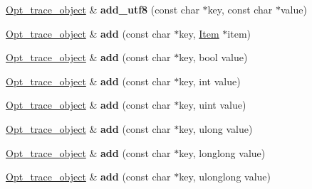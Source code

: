 \begin{DoxyCompactItemize}
\mbox{\hyperlink{classOpt__trace__object}{Opt\+\_\+trace\+\_\+object}} \& {\bfseries add\+\_\+utf8} (const char $\ast$key, const char $\ast$value)
\item 
\mbox{\label{classOpt__trace__object_a8cc4012204abaa38edaae22cf740b76b}} 
\mbox{\hyperlink{classOpt__trace__object}{Opt\+\_\+trace\+\_\+object}} \& {\bfseries add} (const char $\ast$key, \mbox{\hyperlink{classItem}{Item}} $\ast$item)
\item 
\mbox{\label{classOpt__trace__object_ad914de70676c6bf4f9e2e01c61696074}} 
\mbox{\hyperlink{classOpt__trace__object}{Opt\+\_\+trace\+\_\+object}} \& {\bfseries add} (const char $\ast$key, bool value)
\item 
\mbox{\label{classOpt__trace__object_a7935469510d95e01d19e856a3825cca1}} 
\mbox{\hyperlink{classOpt__trace__object}{Opt\+\_\+trace\+\_\+object}} \& {\bfseries add} (const char $\ast$key, int value)
\item 
\mbox{\label{classOpt__trace__object_a061fe9479a9125a7c4e09d5cb9494d0f}} 
\mbox{\hyperlink{classOpt__trace__object}{Opt\+\_\+trace\+\_\+object}} \& {\bfseries add} (const char $\ast$key, uint value)
\item 
\mbox{\label{classOpt__trace__object_aaa3527ead737f82881e1a12662cdef10}} 
\mbox{\hyperlink{classOpt__trace__object}{Opt\+\_\+trace\+\_\+object}} \& {\bfseries add} (const char $\ast$key, ulong value)
\item 
\mbox{\label{classOpt__trace__object_a01eb09a597f2a8c582508b4e48524c7f}} 
\mbox{\hyperlink{classOpt__trace__object}{Opt\+\_\+trace\+\_\+object}} \& {\bfseries add} (const char $\ast$key, longlong value)
\item 
\mbox{\label{classOpt__trace__object_a89a201ef84406dbd4ac2f93f9bac413b}} 
\mbox{\hyperlink{classOpt__trace__object}{Opt\+\_\+trace\+\_\+object}} \& {\bfseries add} (const char $\ast$key, ulonglong value)
\item 
\mbox{\label{classOpt__trace__object_ac3b8601ec84aadeb7a572163f9cef086}} 

\end{DoxyCompactItemize}
